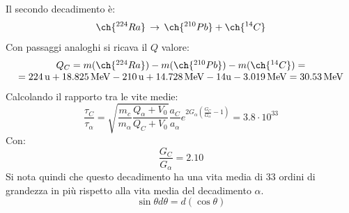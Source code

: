 Il secondo decadimento è:
\begin{equation}
    \ch{^{224}Ra}\,\to\,\ch{^{210}Pb}+\ch{^{14}C}
\end{equation}
Con passaggi analoghi si ricava il $Q$ valore:
\begin{equation}
\begin{array}{c}
       Q_C=m(\ch{^{224}Ra})-m(\ch{^{210}Pb})-m(\ch{^{14}C})=\\
     =224\,\mathrm{u}+18.825\,\mathrm{MeV}-210\,\mathrm{u}+14.728\,\mathrm{MeV}-14\mathrm{u}-3.019\,\mathrm{MeV}=30.53\,\mathrm{MeV}
\end{array}
\end{equation}
Calcolando il rapporto tra le vite medie:
\begin{equation}
    \frac{\tau_C}{\tau_\alpha}=\sqrt{\frac{m_c}{m_\alpha}\frac{Q_\alpha+V_0}{Q_C+V_0}}\frac{a_C}{a_\alpha}e^{2G_\alpha\left(\frac{G_C}{G_\alpha}-1\right)}=3.8\cdot10^{33}
\end{equation}
Con:
\begin{equation}
    \frac{G_C}{G_\alpha}=2.10
\end{equation}
Si nota quindi che questo decadimento ha una vita media di $33$ ordini di grandezza in più rispetto alla vita media del decadimento $\alpha$.
\begin{equation}
    \sin{\theta}d\theta=d(\cos{\theta})
\end{equation}